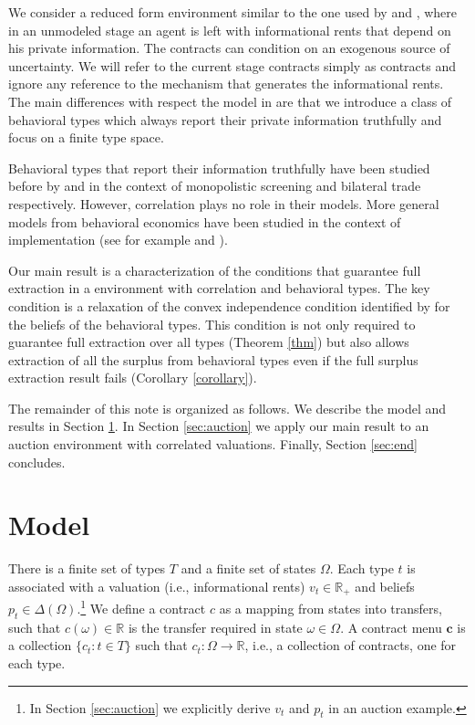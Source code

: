 \documentclass[12pt]{article}
\begin{document}
We consider a reduced form environment similar to the one used by \citet{mcafeereny1992} and \citet{lopomorigottishannon_detectability}, where in an unmodeled stage an agent is left with informational rents that depend on his private information. The contracts can condition on an exogenous source of uncertainty. We will refer to the current stage contracts simply as contracts and ignore any reference to the mechanism that generates the informational rents. The main differences with respect the model in \citet{mcafeereny1992} are that we introduce a class of behavioral types which always report their private information truthfully and focus on a finite type space. 

Behavioral types that report their information truthfully have been studied before by \citet{severinov_deneckere2006} and \citet{saran2011} in the context of monopolistic screening and bilateral trade respectively. However, correlation plays no role in their models. More general models from behavioral economics have been studied in the context of implementation (see for example \citet{eliaz2002} and \citet{declippeletal2018}).

Our main result is a characterization of the conditions that guarantee full extraction in a environment with correlation and behavioral types. The key condition is a relaxation of the convex independence condition identified by \citet{cremermclean1988} for the beliefs of the behavioral types. This condition is not only required to guarantee full extraction over all types (Theorem \ref{thm}) but also allows extraction of all the surplus from behavioral types even if the full surplus extraction result fails (Corollary \ref{corollary}). %

The remainder of this note is organized as follows. We describe the model and results in Section \ref{sec:model}. In Section \ref{sec:auction} we apply our main result to an auction environment with correlated valuations. Finally, Section \ref{sec:end} concludes.

\section{Model}\label{sec:model}


There is a finite set of types $T$ and a finite set of states $\Omega$. Each type $t$ is associated with a valuation (i.e.,  informational rents) $v_t\in\mathbb{R}_+$ and beliefs $p_t\in\Delta(\Omega)$.\footnote{In Section \ref{sec:auction} we explicitly derive $v_t$ and $p_t$ in an auction example.} We define a contract $c$ as a mapping from states into transfers, such that $c(\omega)\in \mathbb{R}$ is the transfer required in state $\omega\in\Omega$. A contract menu $\mathbf{c}$ is a collection $\{c_t: t\in T\}$ such that $c_t:\Omega \to \mathbb{R}$, i.e., a collection of contracts, one for each type.
\end{document}
